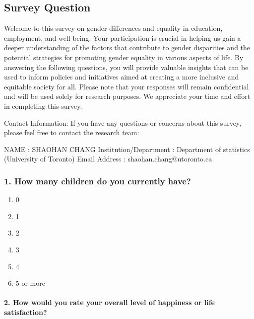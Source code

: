 \documentclass[
  letterpaper,
  DIV=11,
  numbers=noendperiod]{scrartcl}
\let\oldparagraph\paragraph
\renewcommand{\paragraph}[1]{\oldparagraph{#1}\mbox{}}
\providecommand{\tightlist}{%
  \setlength{\itemsep}{0pt}\setlength{\parskip}{0pt}}\usepackage{longtable,booktabs,array}
\begin{document}
\hypertarget{survey-question}{%
\subsection{Survey Question}\label{survey-question}}

Welcome to this survey on gender differences and equality in education,
employment, and well-being. Your participation is crucial in helping us
gain a deeper understanding of the factors that contribute to gender
disparities and the potential strategies for promoting gender equality
in various aspects of life. By answering the following questions, you
will provide valuable insights that can be used to inform policies and
initiatives aimed at creating a more inclusive and equitable society for
all. Please note that your responses will remain confidential and will
be used solely for research purposes. We appreciate your time and effort
in completing this survey.

Contact Information: If you have any questions or concerns about this
survey, please feel free to contact the research team:

NAME : SHAOHAN CHANG Institution/Department : Department of statistics
(University of Toronto) Email Address : shaohan.chang@utoronto.ca

\hypertarget{how-many-children-do-you-currently-have}{%
\subsubsection{1. How many children do you currently
have?}\label{how-many-children-do-you-currently-have}}

\begin{enumerate}
\def\labelenumi{\alph{enumi}.}
\tightlist
\item
  0
\item
  1
\item
  2
\item
  3
\item
  4
\item
  5 or more
\end{enumerate}

\hypertarget{how-would-you-rate-your-overall-level-of-happiness-or-life-satisfaction}{%
\paragraph{2. How would you rate your overall level of happiness or life
satisfaction?}\label{how-would-you-rate-your-overall-level-of-happiness-or-life-satisfaction}}
\end{document}

